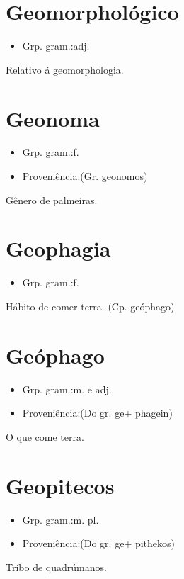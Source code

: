 \section{Geomorphológico}
\begin{itemize}
\item {Grp. gram.:adj.}
\end{itemize}
Relativo á geomorphologia.
\section{Geonoma}
\begin{itemize}
\item {Grp. gram.:f.}
\end{itemize}
\begin{itemize}
\item {Proveniência:(Gr. \textunderscore geonomos\textunderscore )}
\end{itemize}
Gênero de palmeiras.
\section{Geophagia}
\begin{itemize}
\item {Grp. gram.:f.}
\end{itemize}
Hábito de comer terra.
(Cp. \textunderscore geóphago\textunderscore )
\section{Geóphago}
\begin{itemize}
\item {Grp. gram.:m.  e  adj.}
\end{itemize}
\begin{itemize}
\item {Proveniência:(Do gr. \textunderscore ge\textunderscore  + \textunderscore phagein\textunderscore )}
\end{itemize}
O que come terra.
\section{Geopitecos}
\begin{itemize}
\item {Grp. gram.:m. pl.}
\end{itemize}
\begin{itemize}
\item {Proveniência:(Do gr. \textunderscore ge\textunderscore  + \textunderscore pithekos\textunderscore )}
\end{itemize}
Tríbo de quadrúmanos.
